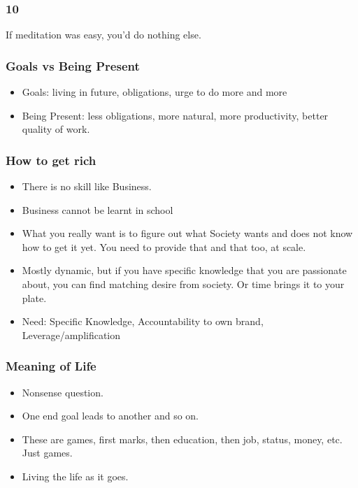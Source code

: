 \begin{frame}[fragile]\frametitle{10}
\begin{center}
If meditation was easy, you’d do nothing else.
\end{center}
\end{frame}


\begin{frame}[fragile]\frametitle{Goals vs Being Present}

\begin{itemize}
\item Goals: living in future, obligations, urge to do more and more
\item Being Present: less obligations, more natural, more productivity, better quality of work.
\end{itemize}

\end{frame}


\begin{frame}[fragile]\frametitle{How to get rich}

\begin{itemize}
\item There is no skill like Business.
\item Business cannot be learnt in school
\item What you really want is to figure out what Society wants and does not know how to get it yet. You need to provide that and that too, at scale.
\item Mostly dynamic, but if you have specific knowledge that you are passionate about, you can find matching desire from society. Or time brings it to your plate.
\item Need: Specific Knowledge, Accountability to own brand, Leverage/amplification
\end{itemize}

\end{frame}

\begin{frame}[fragile]\frametitle{Meaning of Life}

\begin{itemize}
\item Nonsense question.
\item One end goal leads to another and so on.
\item These are games, first marks, then education, then job, status, money, etc. Just games.
\item Living the life as it goes.
\end{itemize}

\end{frame}


